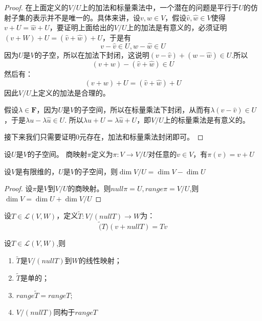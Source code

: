 \documentclass[10pt,a4paper,UTF8]{article}
\begin{document}
\begin{proof}
在上面定义的\(V/U\)上的加法和标量乘法中，一个潜在的问题是平行于\(U\)的仿射子集的表示并不是唯一的。具体来讲，设\(v,w\in V\)，假设\(\hat{v},\hat{w}\in V\)使得\(v+U = \hat{w} + U\)，要证明上面给出的\(V/U\)上的加法是有意义的，必须证明\((v+W) + U = (\hat{v} + \hat{w}) + U\)，于是有\[v-\hat{v}\in U,w-\hat{w}\in U\]
因为\(U\)是\(V\)的子空，所以在加法下封闭，这说明\((v-\hat{v}) + (w-\hat{w}) \in U\).所以
\[(v+w) - (\hat{v}+\hat{w}) \in U\]然后有：\[(v+w) +U = (\hat{v}+\hat{w}) + U\]因此\(V/U\)上定义的加法是合理的。

假设\(\lambda \in \mathbf{F}\)，因为\(U\)是\(V\)的子空间，所以在标量乘法下封闭，从而有\(\lambda (v-\hat{v}) \in U\)，于是\(\lambda u - \lambda \hat{u} \in U\). 所以\(\lambda u + U = \lambda \hat{u} + U\)，即\(V/U\)上的标量乘法是有意义的。

接下来我们只需要证明\(0\)元存在，加法和标量乘法封闭即可。
\end{proof}

\begin{definition}
设\(U\)是\(V\)的子空间。 商映射\(\pi\)定义为\(\pi: V\rightarrow V/U\)对任意的\(v\in V\)，有\(\pi(v) = v+ U\)
\end{definition}
\begin{theorem}
设\(V\)是有限维的，\(U\)是\(V\)的子空间，则\(\dim V/U = \dim V - \dim U\) 
\end{theorem}
\begin{proof}
设\(\pi\)是\(V\)到\(V/U\)的商映射。则\(null\pi = U,range\pi = V/U\),则\(\dim V = \dim U + \dim V/U\)
\end{proof}
\begin{definition}
设\(T\in \mathcal{L}(V,W)\)，定义\(\tilde{T}:V/(nullT)\rightarrow W\)为：\[\tilde(T)(v + nullT) = Tv\]
\end{definition}
\begin{theorem}
设\(T\in \mathcal{L}(V,W)\),则
\begin{enumerate}
\item \(\tilde{T}\)是\(V/(nullT)\)到\(W\)的线性映射；
\item \(\tilde{T}\)是单的；
\item \(range{\tilde{T}} = rangeT\);
\item \(V/(nullT)\)同构于\(rangeT\)
\end{enumerate}
\end{theorem}
\end{document}
